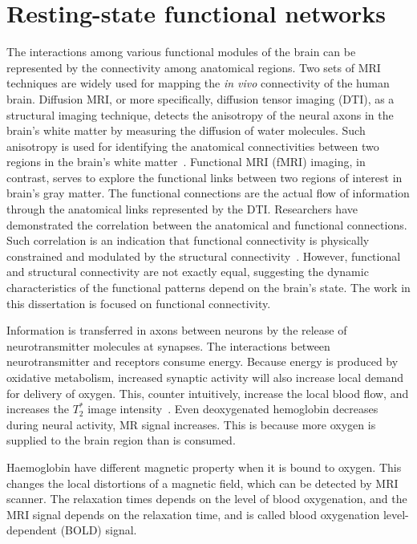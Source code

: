 \section{Resting-state functional networks}
The interactions among various functional modules of the brain can be
represented by the connectivity among anatomical regions. Two sets of MRI
techniques are widely used for mapping the \emph{in vivo} connectivity of the
human brain. Diffusion MRI, or more specifically, diffusion tensor imaging
(DTI), as a structural imaging technique, detects the anisotropy of the neural
axons in the brain's white matter by measuring the diffusion of water
molecules. Such anisotropy is used for identifying the anatomical connectivities
between two regions in the brain's white
matter~\cite{jirsa2007handbook}. Functional MRI (fMRI) imaging, in contrast,
serves to explore the functional links between two regions of interest in
brain's gray matter. The functional connections are the actual flow of
information through the anatomical links represented by the DTI. Researchers
have demonstrated the correlation between the anatomical and functional
connections. Such correlation is an indication that functional connectivity is
physically constrained and modulated by the structural
connectivity~\cite{honey2009predicting}. However, functional and structural
connectivity are not exactly equal, suggesting the dynamic characteristics of
the functional patterns depend on the brain's state. The work in this dissertation
is focused on functional connectivity.

Information is transferred in axons between neurons by the release of
neurotransmitter molecules at synapses. The interactions between
neurotransmitter and receptors consume energy. Because energy is produced by
oxidative metabolism, increased synaptic activity will also increase local
demand for delivery of oxygen. This, counter intuitively, increase the local
blood flow, and increases the $T_2^*$ image
intensity~\cite{lewin2003functional,stroman2011essentials}. Even deoxygenated
hemoglobin decreases during neural activity, MR signal increases. This is
because more oxygen is supplied to the brain region than is consumed.

Haemoglobin have different magnetic property when it is bound to oxygen. This
changes the local distortions of a magnetic field, which can be detected by MRI
scanner. The relaxation times depends on the level of blood oxygenation, and the
MRI signal depends on the relaxation time, and is called blood oxygenation
level-dependent (BOLD) signal.

